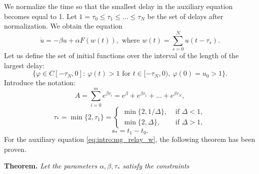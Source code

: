 We normalize the time so that the smallest delay in the auxiliary equation becomes equal to 1. Let $1 = \tau_0 \leq \tau_1 \leq \ldots \leq \tau_N$ be the set of delays after normalization. We obtain the equation
\begin{equation}
	\label{eq:intro:mg_relay_w}
	\dot{u}=-\beta u+\alpha F(w(t)), \text{ where } w(t) = \sum\limits_{s = 0}^N u(t - \tau_s).
\end{equation}
%
Let us define the set of initial functions over the interval of the length of the largest delay: 
%
\begin{equation}
	\label{eq:intro:mg_init_set}
	\{\varphi\in C[-\tau_{N},0]:\  \varphi(t)>1 \text{ for } t\in[-\tau_{N},0),\ \varphi(0)=u_0 > 1\}.
\end{equation}
%
Introduce the notation:
%
\begin{equation*}
	A = \sum_{i=0}^{m}e^{\beta \tau_{i}}=e^\beta+e^{\beta \tau_1}+\ldots+e^{\beta \tau_{N}},
\end{equation*}
\begin{equation*}
	\tau_* = \min\{2,\tau_1\}=\left\lbrace\begin{array}{cl}
		\min\{2,1/\Delta\}, & \text{ if } \Delta < 1,
		\\
		\min\{2,\Delta\}, & \text{ if } \Delta > 1,
	\end{array}\right.
\end{equation*}
\begin{equation*}
	s_* = t_1-t_0.
\end{equation*}
%
For the auxiliary equation \eqref{eq:intro:mg_relay_w}, the following theorem has been proven.

\textbf{Theorem.} \textit{Let the parameters $\alpha, \beta, \tau_*$ satisfy the constraints}

